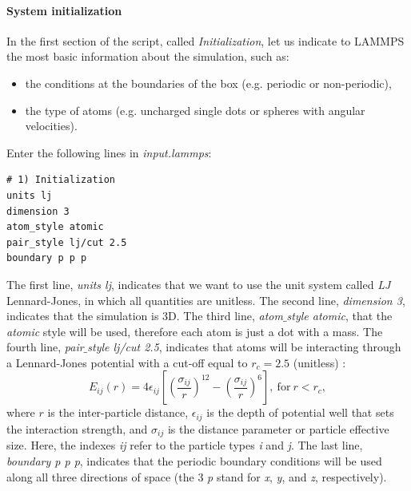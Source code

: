 \documentclass[9pt,tutorial]{livecoms}
\begin{document}
\paragraph{System initialization}
In the first section of the script, called \textit{Initialization}, let us indicate to LAMMPS the most basic information about the simulation, such as:
\begin{itemize}
\item the conditions at the boundaries of the box (e.g. periodic or non-periodic),
\item the type of atoms (e.g. uncharged single dots or spheres with angular velocities).
\end{itemize}
Enter the following lines in \textit{input.lammps}:
{\normalsize \begin{verbatim}
# 1) Initialization
units lj
dimension 3
atom_style atomic
pair_style lj/cut 2.5
boundary p p p
\end{verbatim}}
The first line, \textit{units lj}, indicates that we want to use the unit system called \textit{LJ} Lennard-Jones, in which all quantities are unitless. The second line, \textit{dimension 3}, indicates that the simulation is 3D. The third line, \textit{atom$\_$style atomic}, that the \textit{atomic} style
will be used, therefore each atom is just a dot with a mass. The fourth line, \textit{pair$\_$style lj/cut 2.5}, indicates that atoms will be interacting through a Lennard-Jones potential with a cut-off equal to $r_c = 2.5$ (unitless) \cite{wang2020lennard,fischer2023history}:
$$E_{ij} (r) = 4 \epsilon_{ij} \left[ \left( \dfrac{\sigma_{ij}}{r} \right)^{12} - \left( \dfrac{\sigma_{ij}}{r} \right)^{6} \right], ~ \text{for} ~ r < r_c,$$
where $r$ is the inter-particle distance, $\epsilon_{ij}$ is the depth of potential well that sets the interaction strength, and $\sigma_{ij}$ is the distance parameter or particle effective size. Here, the indexes \textit{ij} refer to the particle types \textit{i} and \textit{j}. The last line, \textit{boundary p p p}, indicates that the periodic boundary conditions will be used along all three directions of space (the 3 \textit{p} stand for \textit{x}, \textit{y}, and \textit{z}, respectively).
\end{document}
